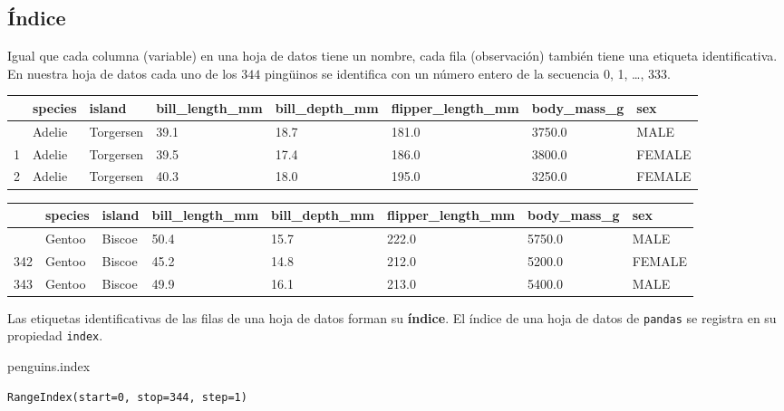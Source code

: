 \documentclass[
  a4paper,
  noprof,
  12pt,
  notoc,
  nosols,
  nobib]{mnye}
\newenvironment{Shaded}{\begin{snugshade}}{\end{snugshade}}
\newcommand{\NormalTok}[1]{\textcolor[rgb]{0.00,0.23,0.31}{#1}}
\theoremstyle{definition}
\theoremstyle{remark}
\begin{document}
\subsection{Índice}\label{uxedndice}

Igual que cada columna (variable) en una hoja de datos tiene un nombre,
cada fila (observación) también tiene una etiqueta identificativa. En
nuestra hoja de datos cada uno de los \(344\) pingüinos se identifica
con un número entero de la secuencia 0, 1, \ldots, 333.

\begin{longtable}[]{@{}llllllll@{}}
\toprule\noalign{}
& species & island & bill\_length\_mm & bill\_depth\_mm &
flipper\_length\_mm & body\_mass\_g & sex \\
\midrule\noalign{}
\endhead
\bottomrule\noalign{}
\endlastfoot
0 & Adelie & Torgersen & 39.1 & 18.7 & 181.0 & 3750.0 & MALE \\
1 & Adelie & Torgersen & 39.5 & 17.4 & 186.0 & 3800.0 & FEMALE \\
2 & Adelie & Torgersen & 40.3 & 18.0 & 195.0 & 3250.0 & FEMALE \\
\end{longtable}

\begin{longtable}[]{@{}llllllll@{}}
\toprule\noalign{}
& species & island & bill\_length\_mm & bill\_depth\_mm &
flipper\_length\_mm & body\_mass\_g & sex \\
\midrule\noalign{}
\endhead
\bottomrule\noalign{}
\endlastfoot
341 & Gentoo & Biscoe & 50.4 & 15.7 & 222.0 & 5750.0 & MALE \\
342 & Gentoo & Biscoe & 45.2 & 14.8 & 212.0 & 5200.0 & FEMALE \\
343 & Gentoo & Biscoe & 49.9 & 16.1 & 213.0 & 5400.0 & MALE \\
\end{longtable}

Las etiquetas identificativas de las filas de una hoja de datos forman
su \textbf{índice}. El índice de una hoja de datos de \texttt{pandas} se
registra en su propiedad \texttt{index}.

\begin{Shaded}
\begin{Highlighting}[]
\NormalTok{penguins.index}
\end{Highlighting}
\end{Shaded}

\begin{verbatim}
RangeIndex(start=0, stop=344, step=1)
\end{verbatim}
\end{document}
